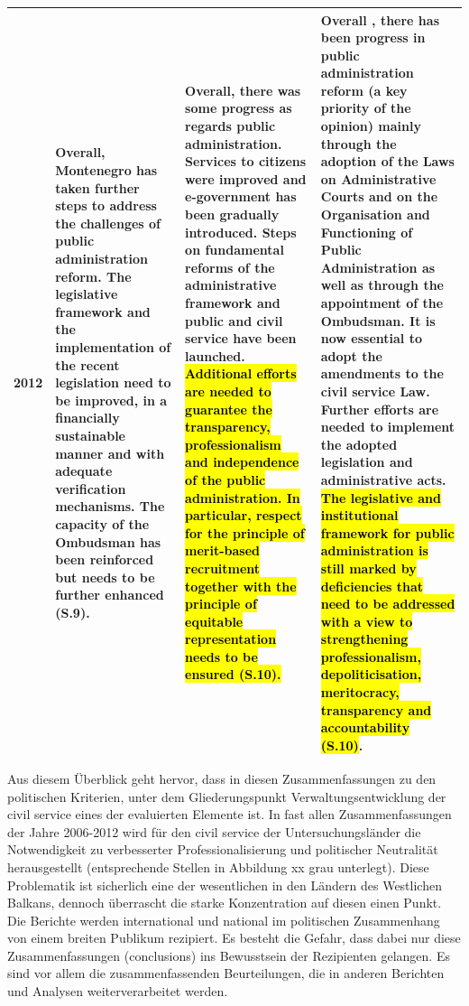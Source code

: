 \begin{footnotesize}
\begin{longtable}[H]{|p{1cm}|L{49mm}|L{44mm}|L{43mm}|}
2012&
Overall, Montenegro has taken further steps to address the challenges of public administration reform. The legislative framework and the implementation of the recent legislation need to be improved, in a financially sustainable manner and with adequate verification mechanisms. The capacity of the Ombudsman has been reinforced but needs to be further enhanced (S.9). &
Overall, there was some progress as regards public administration. Services to citizens were improved and e-government has been gradually introduced. Steps on fundamental reforms of the administrative framework and public and civil service have been launched. \hl{Additional efforts are needed to guarantee the transparency, professionalism and independence of the public administration. In particular, respect for the principle of merit-based recruitment together with the principle of equitable representation needs to be ensured (S.10).}&
Overall , there has been progress in public administration reform (a key priority of the opinion) mainly through the adoption of the Laws on Administrative Courts and on the Organisation and Functioning of Public Administration as well as through the appointment of the Ombudsman. It is now essential to adopt the amendments to the civil service Law. Further efforts are needed to implement the adopted legislation and administrative acts. \hl{The legislative and institutional framework for public administration is still marked by deficiencies that need to be addressed with a view to strengthening professionalism, depoliticisation, meritocracy, transparency and accountability (S.10)}.\\\hline
\end{longtable}
\end{footnotesize}
\par
Aus diesem Überblick geht hervor, dass in diesen Zusammenfassungen zu den politischen Kriterien, unter dem Gliederungspunkt Verwaltungsentwicklung der civil service eines der evaluierten Elemente ist. In fast allen Zusammenfassungen der Jahre 2006-2012 wird für den civil service der Untersuchungsländer die Notwendigkeit zu verbesserter Professionalisierung und politischer Neutralität herausgestellt (entsprechende Stellen in Abbildung xx grau unterlegt). Diese Problematik ist sicherlich eine der wesentlichen in den Ländern des Westlichen Balkans, dennoch überrascht die starke Konzentration auf diesen einen Punkt. Die Berichte werden international und national im politischen Zusammenhang von einem breiten Publikum rezipiert. Es besteht die Gefahr, dass dabei nur diese Zusammenfassungen (conclusions) ins Bewusstsein der Rezipienten gelangen. Es sind vor allem die zusammenfassenden Beurteilungen, die in anderen Berichten und Analysen weiterverarbeitet werden.

